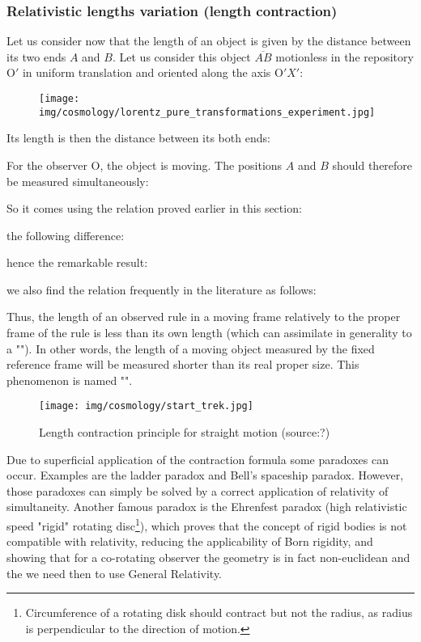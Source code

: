 	\subsubsection{Relativistic lengths variation (length contraction)}
	Let us consider now that the length of an object is given by the distance between its two ends $A$ and $B$. Let us consider this object $\overline{AB}$ motionless in the repository $\text{O}'$ in uniform translation and oriented along the axis $\text{O}'X'$:
	\begin{figure}[H]
		\begin{center}
		\texttt{[image: img/cosmology/lorentz\_pure\_transformations\_experiment.jpg]}
		\end{center}	
	\end{figure}
	Its length is then the distance between its both ends:
	
	For the observer O, the object is moving. The positions $A$ and $B$ should therefore be measured simultaneously:
	
	So it comes using the relation proved earlier in this section:
	
	the following difference:
	
	hence the remarkable result:
	
	we also find the relation frequently in the literature as follows:
	
	Thus, the length of an observed rule in a moving frame relatively to the proper frame of the rule is less than its own length (which can assimilate in generality to a ""). In other words, the length of a moving object measured by the fixed reference frame will be measured shorter than its real proper size. This phenomenon is named "".
	\begin{figure}[H]
		\begin{center}
		\texttt{[image: img/cosmology/start\_trek.jpg]}
		\end{center}	
		\caption{Length contraction principle for straight motion (source:?)}
	\end{figure}
	Due to superficial application of the contraction formula some paradoxes can occur. Examples are the ladder paradox and Bell's spaceship paradox. However, those paradoxes can simply be solved by a correct application of relativity of simultaneity. Another famous paradox is the Ehrenfest paradox (high relativistic speed "rigid" rotating disc\footnote{Circumference of a rotating disk should contract but not the radius, as radius is perpendicular to the direction of motion.}), which proves that the concept of rigid bodies is not compatible with relativity, reducing the applicability of Born rigidity, and showing that for a co-rotating observer the geometry is in fact non-euclidean and the we need then to use General Relativity.
	
